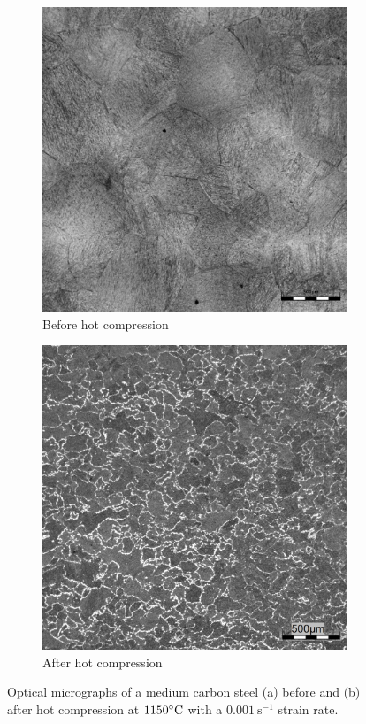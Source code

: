 \documentclass[metals,article,submit,pdftex,moreauthors]{Definitions/mdpi}
\begin{document}
\begin{figure}[!ht]
\centering
\begin{subfigure}[b]{0.45\columnwidth}
\centering
\includegraphics[width=\columnwidth]{Figures/BeforeCompM}
\caption{Before hot compression}
\end{subfigure}
\hfill
\begin{subfigure}[b]{0.45\columnwidth}
\centering
\includegraphics[width=\columnwidth]{Figures/AfterCompM}
\caption{After hot compression}
\end{subfigure}
\caption{Optical micrographs of a medium carbon steel (a) before and (b) after hot compression at $1150\celsius$ with a $0.001~\text{s}^{-1}$ strain rate.}
\label{fig:Micrography}
\end{figure}
\end{document}
